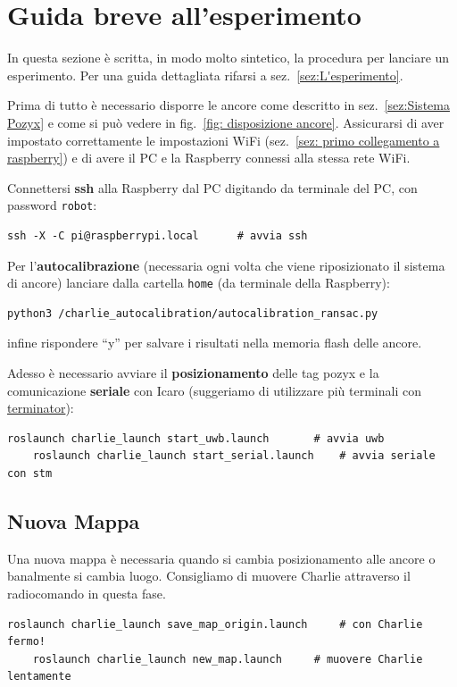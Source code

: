 \newpage
\section{Guida breve all'esperimento}
In questa sezione \`e scritta, in modo molto sintetico, la procedura per lanciare un esperimento. Per una guida dettagliata rifarsi a sez.~\ref{sez:L'esperimento}. 

Prima di tutto \`e necessario disporre le ancore come descritto in sez.~\ref{sez:Sistema Pozyx} e come si pu\`o vedere in fig.~\ref{fig: disposizione ancore}. Assicurarsi di aver impostato correttamente le impostazioni WiFi (sez.~\ref{sez: primo collegamento a raspberry}) e di avere il PC e la Raspberry connessi alla stessa rete WiFi.


Connettersi \textbf{ssh} alla Raspberry dal PC digitando da terminale del PC, con password \texttt{robot}:
\begin{lstlisting}[style=bashPC]
	ssh -X -C pi@raspberrypi.local		# avvia ssh
\end{lstlisting}

Per l'\textbf{autocalibrazione} (necessaria ogni volta che viene riposizionato il sistema di ancore) lanciare 
dalla cartella \texttt{home} (da terminale della Raspberry):
\begin{lstlisting}[style=bash]
	python3 /charlie_autocalibration/autocalibration_ransac.py
\end{lstlisting}
infine rispondere ``y'' per salvare i risultati nella memoria flash delle ancore.

Adesso \`e necessario avviare il \textbf{posizionamento} delle tag pozyx e la comunicazione \textbf{seriale} con Icaro (suggeriamo di utilizzare pi\`u terminali con \href{https://terminator-gtk3.readthedocs.io/en/latest/}{terminator}):
\begin{lstlisting}[style=bash]
	roslaunch charlie_launch start_uwb.launch		# avvia uwb
	roslaunch charlie_launch start_serial.launch	# avvia seriale con stm
\end{lstlisting}

\subsection*{Nuova Mappa}
Una nuova mappa \`e necessaria quando si cambia posizionamento alle ancore o banalmente si cambia luogo. Consigliamo di muovere Charlie attraverso il radiocomando in questa fase.
\begin{lstlisting}[style=bash]
	roslaunch charlie_launch save_map_origin.launch		# con Charlie fermo!
	roslaunch charlie_launch new_map.launch 	# muovere Charlie lentamente
\end{lstlisting}

